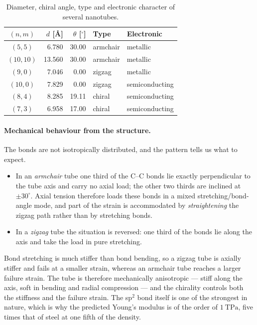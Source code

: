 \documentclass[11pt,a4paper]{article}
\numberwithin{equation}{section}
\theoremstyle{remark}
\begin{document}
\begin{table}[ht]
  \centering
  \caption{Diameter, chiral angle, type and electronic character of several nanotubes.}
  \label{tab:chirality}
  \begin{tabular}{crrll}
    \toprule
    $(n,m)$ & $d$ [\AA] & $\theta$ [$^\circ$] & Type & Electronic \\
    \midrule
    $(5,5)$   &  6.780 & 30.00 & armchair & metallic \\
    $(10,10)$ & 13.560 & 30.00 & armchair & metallic \\
    $(9,0)$   &  7.046 &  0.00 & zigzag   & metallic \\
    $(10,0)$  &  7.829 &  0.00 & zigzag   & semiconducting \\
    $(8,4)$   &  8.285 & 19.11 & chiral   & semiconducting \\
    $(7,3)$   &  6.958 & 17.00 & chiral   & semiconducting \\
    \bottomrule
  \end{tabular}
\end{table}

\paragraph{Mechanical behaviour from the structure.}
The bonds are not isotropically distributed, and the pattern tells us what to expect.
\begin{itemize}\setlength{\itemsep}{2pt}
  \item In an \emph{armchair} tube one third of the C--C bonds lie exactly perpendicular to the tube
    axis and carry no axial load; the other two thirds are inclined at $\pm30^\circ$. Axial tension
    therefore loads these bonds in a mixed stretching/bond-angle mode, and part of the strain is
    accommodated by \emph{straightening} the zigzag path rather than by stretching bonds.
  \item In a \emph{zigzag} tube the situation is reversed: one third of the bonds lie along the axis
    and take the load in pure stretching.
\end{itemize}
Bond stretching is much stiffer than bond bending, so a zigzag tube is axially stiffer and fails at a
smaller strain, whereas an armchair tube reaches a larger failure strain. The tube is therefore
mechanically anisotropic --- stiff along the axis, soft in bending and radial compression --- and the
chirality controls both the stiffness and the failure strain. The sp$^2$ bond itself is one of the
strongest in nature, which is why the predicted Young's modulus is of the order of $\SI{1}{\tera\pascal}$,
five times that of steel at one fifth of the density.
\end{document}
